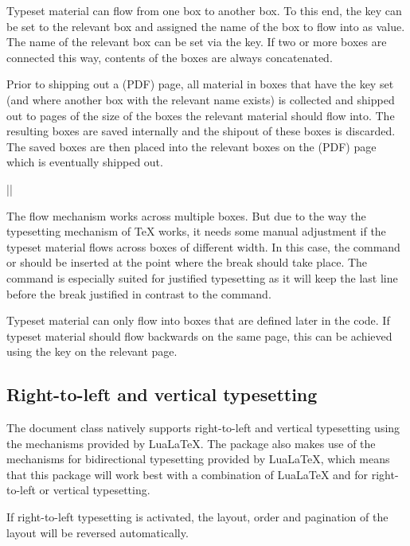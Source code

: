 \documentclass[a4paper]{article}
\begin{document}
Typeset material can flow from one box to another box. To this end, the key  can be set to the relevant box and assigned the name of the box to flow into as value. The name of the relevant box can be set via the  key. If two or more boxes are connected this way, contents of the boxes are always concatenated.

Prior to shipping out a (PDF) page, all material in boxes that have the  key set (and where another box with the relevant name exists) is collected and shipped out to pages of the size of the boxes the relevant material should flow into. The resulting boxes are saved internally and the shipout of these boxes is discarded. The saved boxes are then placed into the relevant boxes on the (PDF) page which is eventually shipped out.

\begin{macrodef}
|\leporelloboxbreak|
\end{macrodef}
The flow mechanism works across multiple boxes. But due to the way the typesetting mechanism of TeX works, it needs some manual adjustment if the typeset material flows across boxes of different width. In this case, the command \macro{\leporelloboxbreak} or \macro{\pagebreak} should be inserted at the point where the break should take place. The command \macro{\leporelloboxbreak} is especially suited for justified typesetting as it will keep the last line before the break justified in contrast to the \macro{\pagebreak} command.

Typeset material can only flow into boxes that are defined later in the code. If typeset material should flow backwards on the same page, this can be achieved using the key  on the relevant page.

\subsection{Right-to-left and vertical typesetting}

The document class natively supports right-to-left and vertical typesetting using the mechanisms provided by LuaLaTeX. The  package also makes use of the mechanisms for bidirectional typesetting provided by LuaLaTeX, which means that this package will work best with a combination of LuaLaTeX and  for right-to-left or vertical typesetting.

If right-to-left typesetting is activated, the layout, order and pagination of the layout will be reversed automatically.
\end{document}
